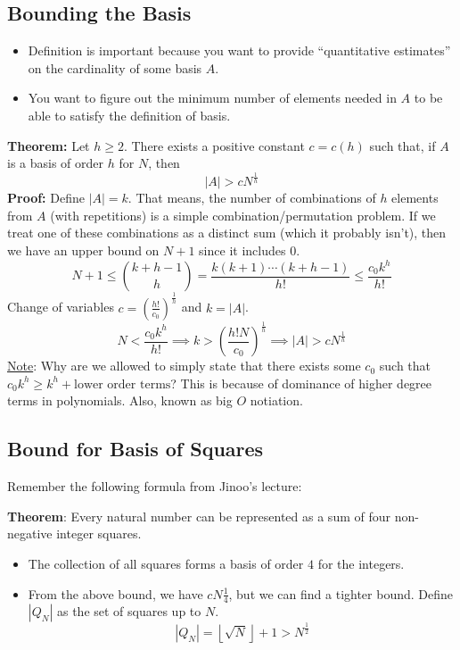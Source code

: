 \documentclass[8pt]{extarticle}
\begin{document}
\subsection{Bounding the Basis}
\begin{itemize}
    \item Definition is important because you want to provide ``quantitative estimates'' on the cardinality of some basis $A$. 
    \item You want to figure out the minimum number of elements needed in $A$ to be able to satisfy the definition of basis. 
\end{itemize}
\begin{boxedsection}
    \textbf{Theorem:} Let $h \geq 2$. There exists a positive constant $c = c(h)$ such that, if $A$ is a basis of order $h$ for $N$, then
    $$
    |A| > cN^{\frac{1}{h}}
    $$
    \textbf{Proof:} Define $|A| = k$. That means, the number of combinations of $h$ elements from $A$ (with repetitions) is a simple combination/permutation problem. If we treat one of these combinations as a distinct sum (which it probably isn't), then we have an upper bound on $N+1$ since it includes $0$.
    $$
    N+1 \leq {k+h-1 \choose h} = \frac{k(k+1)\cdots(k+h-1)}{h!} \leq \frac{c_0k^h}{h!}
    $$
Change of variables $c = \left(\frac{h!}{c_0}\right)^{\frac{1}{h}}$ and $k = |A|$. 
    $$
    N < \frac{c_0k^h}{h!} \implies k > \left(\frac{h! N}{c_0}\right)^{\frac{1}{h}} \implies |A| > cN^{\frac{1}{h}}
    $$
    \underline{Note}: Why are we allowed to simply state that there exists some $c_0$ such that $c_0k^h \geq k^h + \text{lower order terms}$? This is because of dominance of higher degree terms in polynomials. Also, known as big $O$ notiation.
\end{boxedsection}
\subsection{Bound for Basis of Squares}
Remember the following formula from Jinoo's lecture:
\begin{boxedsection}
    \textbf{Theorem}: Every natural number can be represented as a sum of four non-negative integer squares.
\end{boxedsection}
\begin{itemize}
    \item The collection of all squares forms a basis of order $4$ for the integers. 
    \item From the above bound, we have $c N \frac{1}{4}$, but we can find a tighter bound. Define $|Q_N|$ as the set of squares up to $N$.
    $$
    |Q_N| = \left\lfloor \sqrt{N} \right\rfloor + 1 > N^{\frac{1}{2}}
    $$
\end{itemize}
\end{document}
